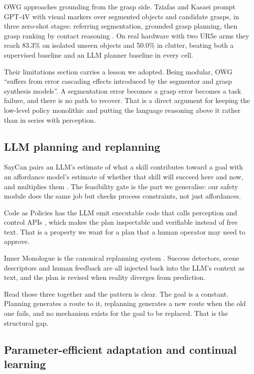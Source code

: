 \documentclass[conference]{IEEEtran}
\begin{document}
OWG approaches grounding from the grasp side. Tziafas and Kasaei prompt
GPT-4V with visual markers over segmented objects and candidate grasps,
in three zero-shot stages: referring segmentation, grounded grasp
planning, then grasp ranking by contact reasoning \cite{owg}. On real
hardware with two UR5e arms they reach 83.3\% on isolated unseen objects
and 50.0\% in clutter, beating both a supervised baseline and an LLM
planner baseline in every cell.

Their limitations section carries a lesson we adopted. Being modular, OWG
``suffers from error cascading effects introduced by the segmentor and
grasp synthesis models''. A segmentation error becomes a grasp error
becomes a task failure, and there is no path to recover. That is a direct
argument for keeping the low-level policy monolithic and putting the
language reasoning above it rather than in series with perception.

\subsection{LLM planning and replanning}

SayCan pairs an LLM's estimate of what a skill contributes toward a goal
with an affordance model's estimate of whether that skill will succeed
here and now, and multiplies them \cite{saycan}. The feasibility gate is
the part we generalise: our safety module does the same job but checks
process constraints, not just affordances.

Code as Policies has the LLM emit executable code that calls perception
and control APIs \cite{cap}, which makes the plan inspectable and
verifiable instead of free text. That is a property we want for a plan
that a human operator may need to approve.

Inner Monologue is the canonical replanning system \cite{innermono}.
Success detectors, scene descriptors and human feedback are all injected
back into the LLM's context as text, and the plan is revised when reality
diverges from prediction.

Read those three together and the pattern is clear. The goal is a
constant. Planning generates a route to it, replanning generates a new
route when the old one fails, and no mechanism exists for the goal to be
replaced. That is the structural gap.

\subsection{Parameter-efficient adaptation and continual learning}
\end{document}
